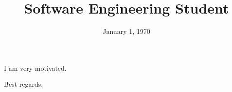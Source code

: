 \documentclass[11pt,a4paper,sans]{moderncv}
\title{Software Engineering Student}
\date{January 1, 1970}
\newcommand\tab[1][1cm]{\hspace*{#1}}
\begin{document}
\makelettertitle

\tab I am very motivated.

\tab Best regards,

{\makeletterclose}
\end{document}
